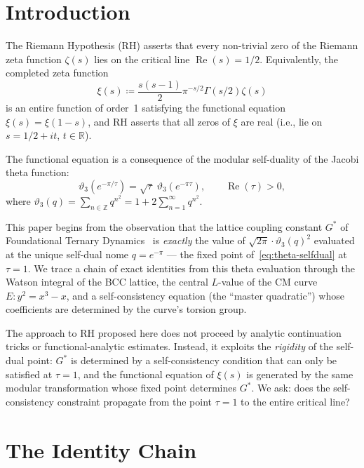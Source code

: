 \documentclass[11pt]{article}
\theoremstyle{tight}
\theoremstyle{plainroman}
\newcommand{\R}{\mathbb{R}}
\newcommand{\Z}{\mathbb{Z}}
\begin{document}
\section{Introduction}

The Riemann Hypothesis (RH) asserts that every non-trivial zero of the Riemann zeta function $\zeta(s)$ lies on the critical line $\operatorname{Re}(s)=1/2$.
Equivalently, the completed zeta function
\[
\xi(s)\coloneqq \frac{s(s-1)}{2}\pi^{-s/2}\Gamma(s/2)\zeta(s)
\]
is an entire function of order~1 satisfying the functional equation $\xi(s)=\xi(1-s)$, and RH asserts that all zeros of $\xi$ are real (i.e., lie on $s=1/2+it$, $t\in\R$).

The functional equation is a consequence of the modular self-duality of the Jacobi theta function:
\begin{equation}\label{eq:theta-selfdual}
\vartheta_3(e^{-\pi/\tau})=\sqrt{\tau}\;\vartheta_3(e^{-\pi\tau}), \qquad \operatorname{Re}(\tau)>0,
\end{equation}
where $\vartheta_3(q)=\sum_{n\in\Z}q^{n^2}=1+2\sum_{n=1}^\infty q^{n^2}$.

This paper begins from the observation that the lattice coupling constant $G^*$ of Foundational Ternary Dynamics~\cite{ftdspec} is \emph{exactly} the value of $\sqrt{2\pi}\cdot\vartheta_3(q)^2$ evaluated at the unique self-dual nome $q=e^{-\pi}$ --- the fixed point of~\eqref{eq:theta-selfdual} at $\tau=1$.
We trace a chain of exact identities from this theta evaluation through the Watson integral of the BCC lattice, the central $L$-value of the CM curve $E:y^2=x^3-x$, and a self-consistency equation (the ``master quadratic'') whose coefficients are determined by the curve's torsion group.

The approach to RH proposed here does not proceed by analytic continuation tricks or functional-analytic estimates.
Instead, it exploits the \emph{rigidity} of the self-dual point: $G^*$ is determined by a self-consistency condition that can only be satisfied at $\tau=1$, and the functional equation of $\xi(s)$ is generated by the same modular transformation whose fixed point determines $G^*$.
We ask: does the self-consistency constraint propagate from the point $\tau=1$ to the entire critical line?

\section{The Identity Chain}
\end{document}
